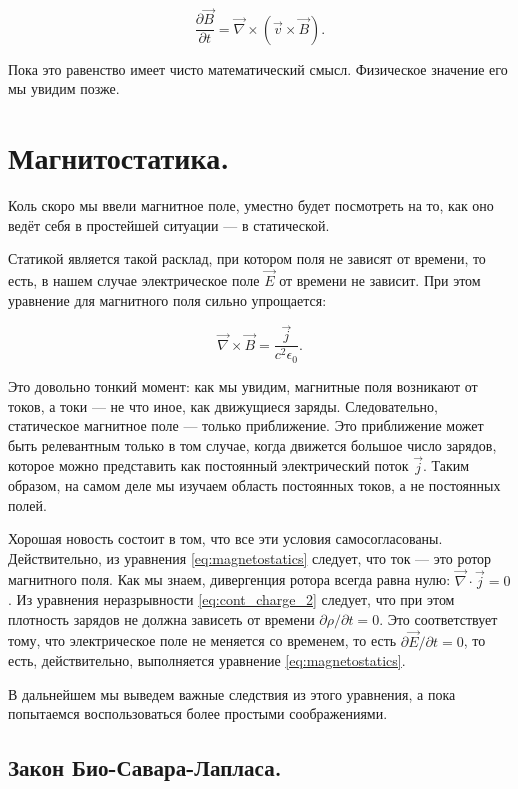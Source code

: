 \documentclass[a4paper,12pt]{article}
\newcommand{\pt}{\partial}
\newcommand{\eps}{\epsilon}
\newcommand{\vn}{\vec{\nabla}}
\begin{document}
\begin{equation}
  \label{eq:db/dt_2}
  \frac{\pt \vec{B}}{\pt t} = \vn \times \left( \vec{v} \times \vec{B}  \right).
\end{equation}

Пока это равенство имеет чисто математический смысл. Физическое
значение его мы увидим позже. 


\section{Магнитостатика.}
\label{sec:magnetostatics}

Коль скоро мы ввели магнитное поле, уместно будет посмотреть на то,
как оно ведёт себя в простейшей ситуации — в статической. 

Статикой является такой расклад, при котором поля не зависят от
времени, то есть, в нашем случае электрическое поле $\vec{E}$ от
времени не зависит. При этом уравнение для магнитного поля сильно
упрощается: 

\begin{equation}
  \label{eq:magnetostatics}
  \vn \times \vec{B} = \frac{\vec{j}}{c^2\eps_0}.
\end{equation}

Это довольно тонкий момент: как мы увидим, магнитные поля возникают от
токов, а токи --- не что иное, как движущиеся заряды. Следовательно,
статическое магнитное поле --- только приближение. Это приближение
может быть релевантным только в том случае, когда движется большое
число зарядов, которое можно представить как постоянный электрический
поток $\vec{j}$. Таким образом, на самом деле мы изучаем область
постоянных токов, а не постоянных полей. 

Хорошая новость состоит в том, что все эти условия
самосогласованы. Действительно, из уравнения \eqref{eq:magnetostatics}
следует, что ток --- это ротор магнитного поля. Как мы знаем,
дивергенция ротора всегда равна нулю: $\vn \cdot \vec{j} =0$. Из
уравнения неразрывности \eqref{eq:cont_charge_2} следует, что при этом
плотность зарядов не должна зависеть от времени $\pt \rho / \pt t
=0$. Это соответствует тому, что электрическое поле не меняется со
временем, то есть $\pt \vec{E}/ \pt t =0$, то есть, действительно,
выполняется уравнение \eqref{eq:magnetostatics}.

В дальнейшем мы выведем важные следствия из этого уравнения, а пока
попытаемся воспользоваться более простыми соображениями. 

\subsection{Закон Био-Савара-Лапласа.}
\label{sec:biot_savart_law}
\end{document}
